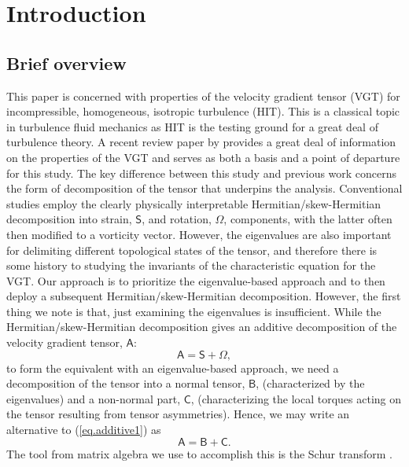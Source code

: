 \documentclass[preprint,amssymb,amsmath,aip,cha]{revtex4-1}
\begin{document}
\maketitle


\section{Introduction}
\label{intro}
\subsection{Brief overview}
This paper is concerned with properties of the velocity gradient tensor (VGT) for incompressible, homogeneous, isotropic turbulence (HIT). This is a classical topic in turbulence fluid mechanics as HIT is the testing ground for a great deal of turbulence theory. A recent review paper by \citet{meneveau11} provides a great deal of information on the properties of the VGT and serves as both a basis and a point of departure for this study. The key difference between this study and previous work concerns the form of decomposition of the tensor that underpins the analysis. Conventional studies employ the clearly physically interpretable Hermitian/skew-Hermitian decomposition into strain, $\mathsf{S}$, and rotation, $\mathsf{\Omega}$, components, with the latter often then modified to a vorticity vector. However, the eigenvalues are also important for delimiting different topological states of the tensor, and therefore there is some history to studying the  invariants of the characteristic equation for the VGT. Our approach is to prioritize the eigenvalue-based approach and to then deploy a subsequent Hermitian/skew-Hermitian decomposition. However, the first thing we note is that, just examining the eigenvalues is insufficient. While the Hermitian/skew-Hermitian decomposition gives an additive decomposition of the velocity gradient tensor, $\mathsf{A}$: 
\begin{equation}
\mathsf{A} = \mathsf{S} + \mathsf{\Omega},
\label{eq.additive1}
\end{equation}
to form the equivalent with an eigenvalue-based approach, we need a decomposition of the tensor into a normal tensor, $\mathsf{B}$, (characterized by the eigenvalues) and a non-normal part, $\mathsf{C}$, (characterizing the local torques acting on the tensor resulting from tensor asymmetries). Hence, we may write an alternative to (\ref{eq.additive1}) as
\begin{equation}
\mathsf{A} = \mathsf{B} + \mathsf{C}.
\label{eq.additive2}
\end{equation}
The tool from matrix algebra we use to accomplish this is the Schur transform \citep{schur1909}.
\end{document}
